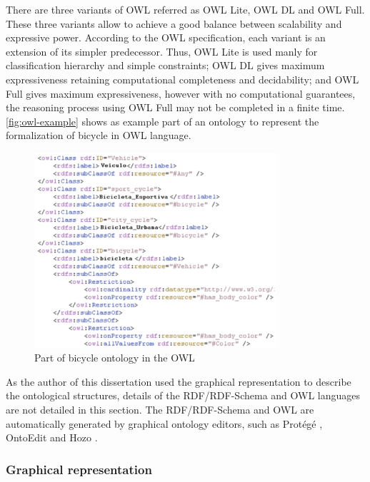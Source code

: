 There are three variants of OWL referred as OWL Lite, OWL DL and OWL Full. These three variants allow to achieve a good balance between scalability and expressive power. According to the OWL specification, each variant is an extension of its simpler predecessor. Thus, OWL Lite is used manly for classification hierarchy and simple constraints; OWL DL gives maximum expressiveness retaining computational completeness and decidability; and OWL Full gives maximum expressiveness, however with no computational guarantees, the reasoning process using OWL Full may not be completed in a finite time. \autoref{fig:owl-example} shows as example part of an ontology to represent the formalization of bicycle in OWL language.


\begin{figure}[htb]
 \caption{Part of bicycle ontology in the OWL}
 \label{fig:owl-example}
 \centering
 \includegraphics[width=0.8\textwidth]{images/chap-general-background/owl-example.png}
\end{figure}


As the author of this dissertation used the graphical representation to describe the ontological structures, details of the RDF/RDF-Schema and OWL languages are not detailed in this section. The RDF/RDF-Schema and OWL are automatically generated by graphical ontology editors, such as Prot\'{e}g\'{e} \cite{NoySintekDeckerCrubezyFergersonMusen2001}, OntoEdit \cite{SureErdmannAngeleStaabStuderWenke2002} and Hozo \cite{KozakiKitamuraIkedaMizoguchi2002}.

\subsubsection{Graphical representation}
\label{subsubsec:graphical-representation}

